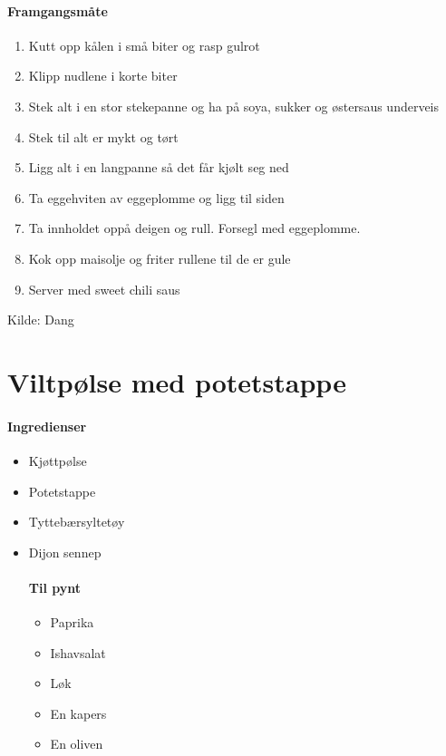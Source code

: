 \documentclass[12pt,a4paper]{book}
\begin{document}
{\paragraph{Framgangsmåte}
\begin{enumerate}[noitemsep]
	\item Kutt opp kålen i små biter og rasp gulrot
	\item Klipp nudlene i korte biter
	\item Stek alt i en stor stekepanne og ha  på soya, sukker og østersaus underveis
	\item Stek til alt er mykt og tørt
	\item Ligg alt i en langpanne så det får kjølt seg ned
	\item Ta eggehviten av eggeplomme og ligg til siden
	\item Ta innholdet oppå deigen og rull.  Forsegl med eggeplomme.
	\item Kok opp maisolje og friter rullene til de er gule
	\item Server med sweet chili saus
\end{enumerate}

Kilde: Dang
\clearpage{}
\clearpage{}\section{﻿Viltpølse med potetstappe}


\paragraph{Ingredienser}
\begin{itemize}[noitemsep]
	\item Kjøttpølse
	\item Potetstappe
	\item Tyttebærsyltetøy
	\item Dijon sennep
	      \paragraph{Til pynt}
	      \begin{itemize}[noitemsep]
	      	\item Paprika
	      	\item Ishavsalat
	      	\item Løk
	      	\item En kapers
	      	\item En oliven
	      \end{itemize}
\end{itemize}

}
\end{document}
